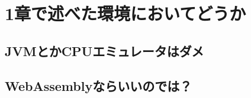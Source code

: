 \chapter{1章で述べた環境においてどうか}
\label{chap:comparison}

\section{JVMとかCPUエミュレータはダメ}

\section{WebAssemblyならいいのでは？}
